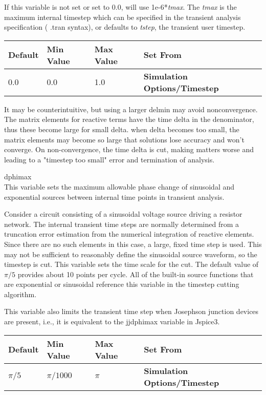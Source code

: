 \begin{description}
If this variable is not set or set to 0.0, {\WRspice} will use {\vt
1e-6}*{\it tmax}.  The {\it tmax} is the maximum internal timestep
which can be specified in the transient analysis specification ({\vt
.tran} syntax), or defaults to {\it tstep}, the transient user
timestep.

\begin{tabular}{|l|l|l|l|}\hline
\bf Default & \bf Min Value & \bf Max Value & \bf Set From\\ \hline
0.0 & 0.0 & 1.0 & \bf Simulation Options/Timestep\\ \hline
\end{tabular}

It may be counterintuitive, but using a larger {\vt delmin} may avoid
nonconvergence.  The matrix elements for reactive terms have the time
delta in the denominator, thus these become large for small delta. 
when delta becomes too small, the matrix elements may become so large
that solutions lose accuracy and won't converge.  On non-convergence,
the time delta is cut, making matters worse and leading to a "timestep
too small" error and termination of analysis.
 
\item{\et dphimax}\\
This variable sets the maximum allowable phase change of sinusoidal
and exponential sources between internal time points in transient
analysis.

Consider a circuit consisting of a sinusoidal voltage source driving a
resistor network.  The internal transient time steps are normally
determined from a truncation error estimation from the numerical
integration of reactive elements.  Since there are no such elements in
this case, a large, fixed time step is used.  This may not be
sufficient to reasonably define the sinusoidal source waveform, so the
timestep is cut.  This variable sets the time scale for the cut.  The
default value of $\pi/5$ provides about 10 points per cycle.  All of
the built-in source functions that are exponential or sinusoidal
reference this variable in the timestep cutting algorithm.

This variable also limits the transient time step when Josephson
junction devices are present, i.e., it is equivalent to the {\et
jjdphimax} variable in Jspice3.

\begin{tabular}{|l|l|l|l|}\hline
\bf Default & \bf Min Value & \bf Max Value & \bf Set From\\ \hline
$\pi/5$ & $\pi/1000$ & $\pi$ & \bf Simulation Options/Timestep\\ \hline
\end{tabular}


\end{description}
